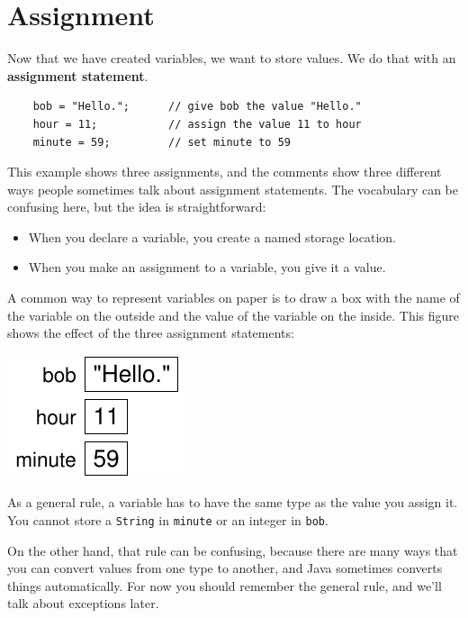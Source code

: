 \documentclass[12pt]{book}
\theoremstyle{exercise}
\begin{document}
\section{Assignment}

Now that we have created variables, we want to
store values.  We do that with an {\bf assignment
statement}.

\begin{lstlisting}
    bob = "Hello.";      // give bob the value "Hello."
    hour = 11;           // assign the value 11 to hour
    minute = 59;         // set minute to 59
\end{lstlisting}
%
This example shows three assignments, and the comments show
three different ways people sometimes talk about assignment
statements.  The vocabulary can be confusing here, but the
idea is straightforward:

\begin{itemize}

\item When you declare a variable, you create a named storage location.

\item When you make an assignment to a variable, you give it a value.

\end{itemize}

A common way to represent variables on paper is to draw a box
with the name of the variable on the outside and the value
of the variable on the inside.  This figure shows
the effect of the three assignment statements:


\includegraphics{figs/assign.pdf}


As a general rule,
a variable has to have the same type as the
value you assign it.  You cannot store a {\tt String} in {\tt minute} or an
integer in {\tt bob}.

On the other hand, that rule can be confusing, because there are many
ways that you can convert values from one type to another, and Java
sometimes converts things automatically.  For now you should
remember the general rule, and we'll talk about exceptions later.
\end{document}
